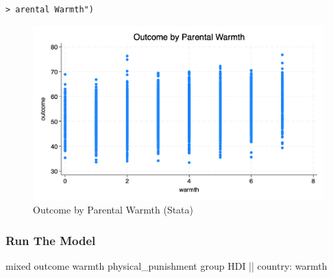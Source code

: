\documentclass[
  letterpaper,
  DIV=11,
  numbers=noendperiod]{scrreprt}
\newenvironment{Shaded}{\begin{snugshade}}{\end{snugshade}}
\newcommand{\FunctionTok}[1]{\textcolor[rgb]{0.28,0.35,0.67}{#1}}
\newcommand{\NormalTok}[1]{\textcolor[rgb]{0.00,0.23,0.31}{#1}}
\begin{document}
\begin{verbatim}
> arental Warmth") 
\end{verbatim}

\begin{figure}

{\centering \includegraphics{scatter.png}

}

\caption{\label{fig-Stata}Outcome by Parental Warmth (Stata)}

\end{figure}

\hypertarget{run-the-model}{%
\subsubsection{Run The Model}\label{run-the-model}}

\begin{Shaded}
\begin{Highlighting}[]

\NormalTok{mixed outcome warmth physical\_punishment }\FunctionTok{group}\NormalTok{ HDI || country: warmth}
\end{Highlighting}
\end{Shaded}
\end{document}
